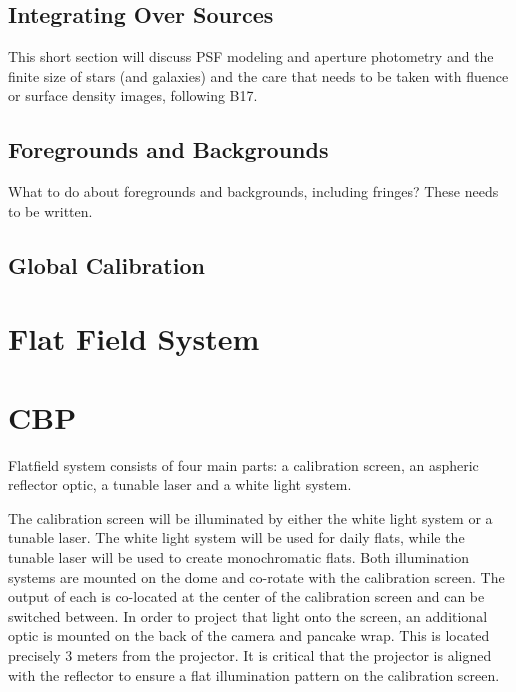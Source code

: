 \documentclass[SE,authoryear,lsstdraft,toc]{lsstdoc}
\begin{document}
\subsection{Integrating Over Sources}

This short section will discuss PSF modeling and aperture photometry and the
finite size of stars (and galaxies) and the care that needs to be taken with
fluence or surface density images, following B17.

\subsection{Foregrounds and Backgrounds}
\label{sec:photom:backgrounds}

What to do about foregrounds and backgrounds, including fringes?  These needs
to be written.

\subsection{Global Calibration}

\section{Flat Field System}


\section{CBP}

Flatfield system consists of four main parts: a calibration screen, an aspheric reflector optic, a tunable laser and a white light system. 

The calibration screen will be illuminated by either the white light system or
a tunable laser. The white light system will be used for daily flats, while the
tunable laser will be used to create monochromatic flats. Both illumination
systems are mounted on the dome and co-rotate with the calibration screen. The
output of each is co-located at the center of the calibration screen and can be
switched between. In order to project that light onto the screen, an additional
optic is mounted on the back of the camera and pancake wrap. This is located
precisely 3 meters from the projector. It is critical that the projector is
aligned with the reflector to ensure a flat illumination pattern on the
calibration screen.
\end{document}

